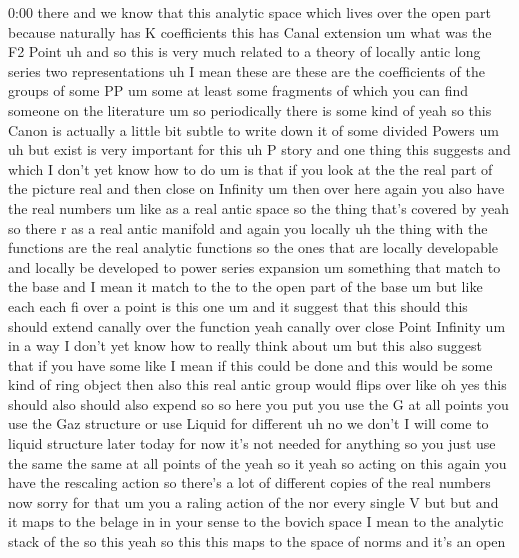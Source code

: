\begin{unfinished}{0:00}
there  and  we  know  that  this  analytic
space  which  lives  over  the  open  part
because  naturally  has  K  coefficients
this  has  Canal
extension  um  what  was  the  F2
Point  uh  and  so  this  is  very  much
related  to  a  theory  of
locally
antic  long  series  two
representations  uh  I  mean  these  are
these  are  the  coefficients  of  the  groups
of  some
PP  um  some  at  least  some  fragments  of
which  you  can  find  someone  on  the
literature
um  so
periodically  there  is  some  kind  of  yeah
so  this  Canon  is  actually  a  little  bit
subtle  to  write  down  it  of  some  divided
Powers
um  uh  but  exist  is  very  important  for
this  uh  P
story
and  one  thing  this
suggests  and  which  I  don't  yet  know  how
to
do  um  is  that  if  you  look  at  the  the
real  part  of  the  picture
real  and  then  close  on  Infinity  um  then
over  here  again  you  also  have  the  real
numbers  um  like  as  a  real  antic  space  so
the  thing  that's  covered
by  yeah  so  there  r  as  a  real  antic
manifold  and  again  you
locally  uh  the  thing  with  the  functions
are  the  real  analytic  functions  so  the
ones  that  are  locally  developable  and
locally  be  developed  to  power  series
expansion  um  something  that  match  to  the
base  and  I  mean  it  match  to  the  to  the
open  part  of  the  base  um  but  like  each
each  fi  over  a  point  is  this  one  um  and
it  suggest  that  this  should  this  should
extend  canally  over  the
function  yeah  canally  over  close  Point
Infinity
um  in  a
way  I  don't  yet  know  how  to  really  think
about  um  but  this  also  suggest  that  if
you  have  some  like  I  mean  if  this  could
be  done  and  this  would  be  some  kind  of
ring  object  then  also  this  real  antic
group  would  flips  over  like  oh  yes  this
should  also  should  also
expend
so  so  here  you  put  you  use  the
G  at  all  points  you  use  the  Gaz
structure  or  use  Liquid  for  different  uh
no  we
don't  I  will  come  to  liquid  structure
later  today  for  now  it's  not  needed  for
anything  so  you  just  use  the  same  the
same  at  all  points  of  the  yeah  so  it
yeah  so  acting  on  this  again  you  have
the  rescaling  action  so  there's  a  lot  of
different  copies  of  the  real  numbers  now
sorry  for  that  um  you  a  raling  action  of
the  nor  every  single
V  but  but  and  it  maps  to  the
belage  in  in  your  sense  to  the  bovich
space  I  mean  to  the  analytic  stack  of
the  so  this  yeah  so  this  this  maps  to
the  space  of  norms  and  it's  an  open

\end{unfinished}
